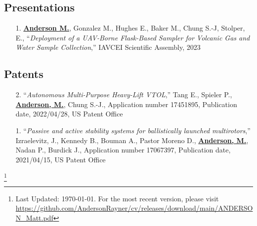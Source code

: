 \documentclass[12pt,letter,sans]{moderncv}
\newcommand\blfootnote[1]{%
  \begingroup
  \renewcommand\thefootnote{}\footnote{#1}%
  \addtocounter{footnote}{-1}%
  \endgroup
}
\begin{document}




\newpage

\subsection{Presentations}

\begin{itemize}
	\item [1.] \underline{\textbf{Anderson M.}}, Gonzalez M., Hughes E., Baker M., Chung S.-J, Stolper, E., ``\textit{Deployment of a UAV-Borne Flask-Based Sampler for Volcanic Gas and Water Sample Collection},'' IAVCEI Scientific Assembly, 2023
\end{itemize}

\subsection{Patents}

\begin{itemize}
    \item [2.] ``\textit{Autonomous Multi-Purpose Heavy-Lift VTOL},'' Tang E., Spieler P., \underline{\textbf{Anderson, M.}}, Chung S.-J., Application number 17451895, Publication date, 2022/04/28, US Patent Office

    \item [1.] ``\textit{Passive and active stability systems for ballistically launched multirotors},'' Izraelevitz, J., Kennedy B., Bouman A., Pastor Moreno D., \underline{\textbf{Anderson, M.}}, Nadan P., Burdick J., Application number 17067397, Publication date, 2021/04/15, US Patent Office
\end{itemize}


\vfill
\enlargethispage{\footskip}
\blfootnote{Last Updated: \today.  For the most recent version, please visit \url{https://github.com/AndersonRayner/cv/releases/download/main/ANDERSON_Matt.pdf}}
\end{document}
